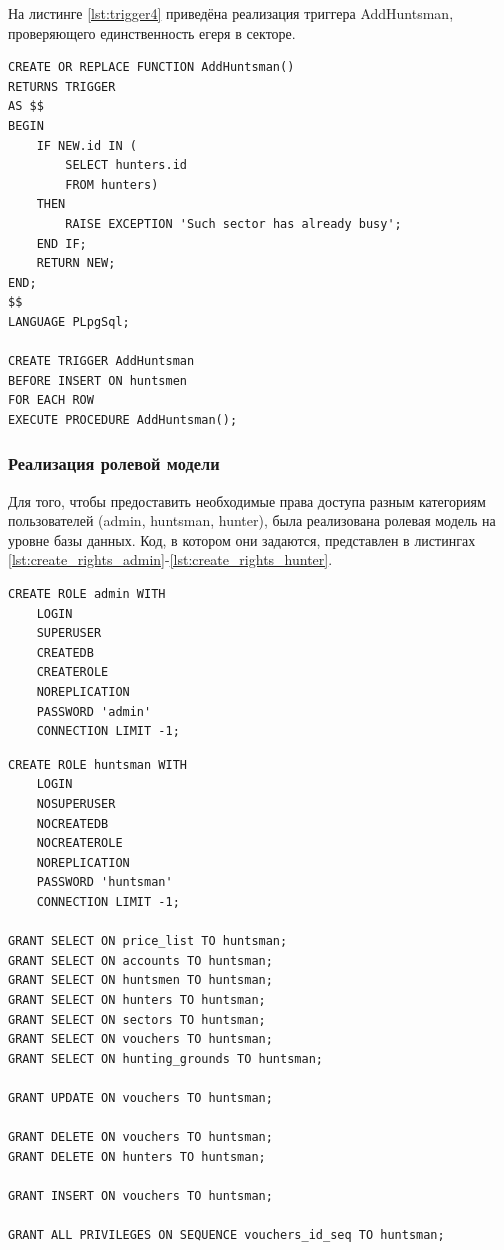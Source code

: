 		На листинге \ref{lst:trigger4} приведёна реализация триггера AddHuntsman, проверяющего единственность егеря в секторе.

		\begin{lstlisting}[caption = {Реализация триггера AddHuntsman}, label=lst:trigger4]
CREATE OR REPLACE FUNCTION AddHuntsman()
RETURNS TRIGGER
AS $$
BEGIN
	IF NEW.id IN (
		SELECT hunters.id
		FROM hunters)
	THEN
		RAISE EXCEPTION 'Such sector has already busy';
	END IF;
	RETURN NEW;
END;
$$
LANGUAGE PLpgSql;

CREATE TRIGGER AddHuntsman
BEFORE INSERT ON huntsmen
FOR EACH ROW
EXECUTE PROCEDURE AddHuntsman();
		\end{lstlisting}
	
		\subsubsection{Реализация ролевой модели}
		Для того, чтобы предоставить необходимые права доступа разным категориям пользователей (admin, huntsman, hunter), была реализована ролевая модель на уровне базы данных. Код, в котором они задаются, представлен в листингах \ref{lst:create_rights_admin}-\ref{lst:create_rights_hunter}.
		
		\begin{lstlisting}[caption = {Создание админа}, label=lst:create_rights_admin]
CREATE ROLE admin WITH
	LOGIN
	SUPERUSER
	CREATEDB
	CREATEROLE
	NOREPLICATION
	PASSWORD 'admin'
	CONNECTION LIMIT -1;
		\end{lstlisting}
	
		\begin{lstlisting}[caption = {Создание huntsman и задание прав}, label=lst:create_rights_huntsman]
CREATE ROLE huntsman WITH
	LOGIN
	NOSUPERUSER
	NOCREATEDB
	NOCREATEROLE
	NOREPLICATION
	PASSWORD 'huntsman'
	CONNECTION LIMIT -1;
	
GRANT SELECT ON price_list TO huntsman;
GRANT SELECT ON accounts TO huntsman;
GRANT SELECT ON huntsmen TO huntsman;
GRANT SELECT ON hunters TO huntsman;
GRANT SELECT ON sectors TO huntsman;
GRANT SELECT ON vouchers TO huntsman;
GRANT SELECT ON hunting_grounds TO huntsman;

GRANT UPDATE ON vouchers TO huntsman;

GRANT DELETE ON vouchers TO huntsman;
GRANT DELETE ON hunters TO huntsman;

GRANT INSERT ON vouchers TO huntsman;

GRANT ALL PRIVILEGES ON SEQUENCE vouchers_id_seq TO huntsman;
		\end{lstlisting}
	
